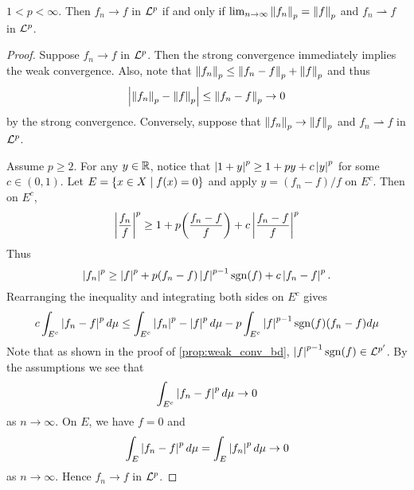 \begin{theorem}
    $1<p<\infty$. Then $f_n\to f$ in $\mathcal{L}^p$ if and only if 
    $\lim_{n\to\infty} \left\lVert {f_n} \right\rVert_p = \left\lVert {f} \right\rVert_p$ and 
    $f_n\rightharpoonup f$ in $\mathcal{L}^p$.
\end{theorem}
\begin{proof}
    Suppose $f_n\to f$ in $\mathcal{L}^p$. Then the strong convergence 
    immediately implies the weak convergence. Also, note that 
    $\left\lVert {f_n} \right\rVert_p\leq\left\lVert {f_n-f} \right\rVert_p+\left\lVert {f} \right\rVert_p$ and thus 
    \begin{equation*}
        \left\lvert {\left\lVert {f_n} \right\rVert_p-\left\lVert {f} \right\rVert_p} \right\rvert \leq \left\lVert {f_n-f} \right\rVert_p\to 0
    \end{equation*}
    by the strong convergence. Conversely, suppose that 
    $\left\lVert {f_n} \right\rVert_p\to\left\lVert {f} \right\rVert_p$ and $f_n\rightharpoonup f$ in 
    $\mathcal{L}^p$. 
    
    Assume $p\geq 2$. For any $y\in\mathbb{R}$, notice that $\left\lvert {1+y} \right\rvert^p 
    \geq 1 + py + c\left\lvert {y} \right\rvert^p$ for some $c\in(0,1)$. Let 
    $E = \left\{ x\in X \;\middle\vert\; f(x) = 0 \right\}$ and apply $y = (f_n-f)/f$ 
    on $E^c$. Then on $E^c$,
    \begin{equation*}
        \abs{\frac{f_n}{f}}^p
        \geq 1 + p\pth{\frac{f_n-f}{f}} + c\abs{\frac{f_n-f}{f}}^p
    \end{equation*}
    Thus 
    \begin{equation*}
        \left\lvert {f_n} \right\rvert^p\geq \left\lvert {f} \right\rvert^p + p(f_n-f)\left\lvert {f} \right\rvert^{p-1}\operatorname{sgn}(f) + c\left\lvert {f_n-f} \right\rvert^p.
    \end{equation*}
    Rearranging the inequality and integrating both sides on 
    $E^c$ gives 
    \begin{equation*}
        c\int_{E^c} \left\lvert {f_n-f} \right\rvert^pd\mu 
        \leq \int_{E^c}\left\lvert {f_n} \right\rvert^p-\left\lvert {f} \right\rvert^pd\mu - p\int_{E^c}\left\lvert {f} \right\rvert^{p-1}\operatorname{sgn}(f)(f_n-f)d\mu
    \end{equation*}
    Note that as shown in the proof of \cref{prop:weak_conv_bd}, 
    $\left\lvert {f} \right\rvert^{p-1}\operatorname{sgn}(f)\in\mathcal{L}^{p'}$. By the assumptions we see 
    that 
    \begin{equation*}
        \int_{E^c} \left\lvert {f_n-f} \right\rvert^pd\mu\to 0
    \end{equation*}
    as $n\to\infty$. On $E$, we have $f = 0$ and 
    \begin{equation*}
        \int_E \left\lvert {f_n-f} \right\rvert^pd\mu = \int_E \left\lvert {f_n} \right\rvert^pd\mu \to 0
    \end{equation*}
    as $n\to\infty$. Hence $f_n\to f$ in $\mathcal{L}^p$.


\end{proof}
